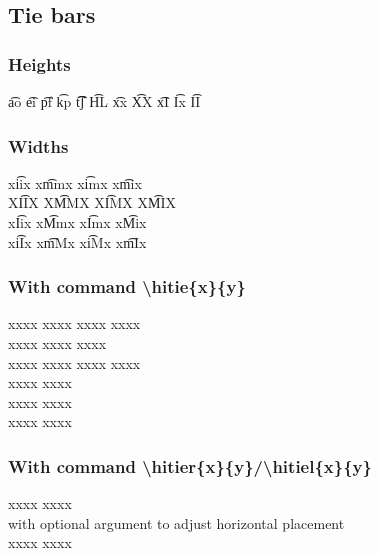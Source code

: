 \subsection{Tie bars}
\subsubsection{Heights}
a͡o     
e͡i     
p͡f     
k͡p     
t͡͡ʃ    
H͡L     
x͡x     
X͡X     
x͡I     
I͡x     
I͡I     


\subsubsection{Widths}
xi͡ix    
xm͡mx    
xi͡mx    
xm͡ix   
\\
XI͡IX    
XM͡MX    
XI͡MX    
XM͡IX   
\\       
xI͡ix    
xM͡mx    
xI͡mx    
xM͡ix    
\\        
xi͡Ix    
xm͡Mx    
xi͡Mx    
xm͡Ix    


\subsubsection{With command \textbackslash hitie\{x\}\{y\}}

xxxx   
xxxx   
xxxx   
xxxx  
\\
xxxx  
xxxx  
xxxx  
\\                 
xxxx  
xxxx  
xxxx  
xxxx  
\\                  
xxxx  
xxxx  
\\                  
xxxx  
xxxx 
\\                  
xxxx 
xxxx \\

\subsubsection{With command \textbackslash hitier\{x\}\{y\}/\textbackslash hitiel\{x\}\{y\}}
xxxx           
xxxx          
\\
with optional argument to adjust horizontal placement\\
xxxx      
xxxx      